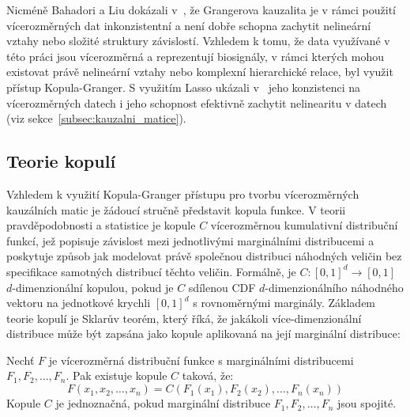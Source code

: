 Nicméně Bahadori a Liu dokázali v~\cite{Bahadori2013}, že Grangerova kauzalita
je v rámci použití vícerozměrných dat inkonzistentní a není dobře schopna
zachytit nelineární vztahy nebo složité struktury závislostí. Vzhledem k tomu,
že data využívané v této práci jsou vícerozměrná a reprezentují biosignály, v
rámci kterých mohou existovat právě nelineární vztahy nebo komplexní
hierarchické relace, byl využit přístup Kopula-Granger. S využitím Lasso ukázali
v~\cite{Bahadori2013} jeho konzistenci na vícerozměrných datech i jeho schopnost
efektivně zachytit nelinearitu v datech (viz
sekce~\ref{subsec:kauzalni_matice}).

\subsection{Teorie kopulí}
\label{subsec:teorie_kopul}
Vzhledem k využití Kopula-Granger přístupu pro tvorbu vícerozměrných kauzálních
matic je žádoucí stručně představit kopula funkce. V teorii pravděpodobnosti a
statistice je kopule $C$ vícerozměrnou kumulativní distribuční funkcí, jež
popisuje závislost mezi jednotlivými marginálními distribucemi a poskytuje
způsob jak modelovat právě společnou distribuci náhodných veličin bez
specifikace samotných distribucí těchto veličin. Formálně, je
$C:[0,1]^{d}\rightarrow [0,1]$ $d$-dimenzionální kopulou, pokud je $C$ sdílenou
\gls{CDF} $d$-dimenzionálního náhodného vektoru na jednotkové krychli
$[0,1]^{d}$ s rovnoměrnými marginály. Základem teorie kopulí je Sklarův teorém,
který říká, že jakákoli více-dimenzionální distribuce může být zapsána jako
kopule aplikovaná na její marginální distribuce:

\begin{theorem}
    \label{theorem:sklar}
    Nechť $F$ je vícerozměrná distribuční funkce s marginálními distribucemi
    $F_1, F_2, \ldots, F_n$. Pak existuje kopule $C$ taková, že:
    \begin{equation}
        F\left(x_1, x_2, \ldots, x_n\right)=C\left(F_1\left(x_1\right), F_2\left(x_2\right), \ldots, F_n\left(x_n\right)\right)
    \end{equation}
    Kopule $C$ je jednoznačná, pokud marginální distribuce $F_1, F_2, \ldots, F_n$ jsou spojité.
\end{theorem}

